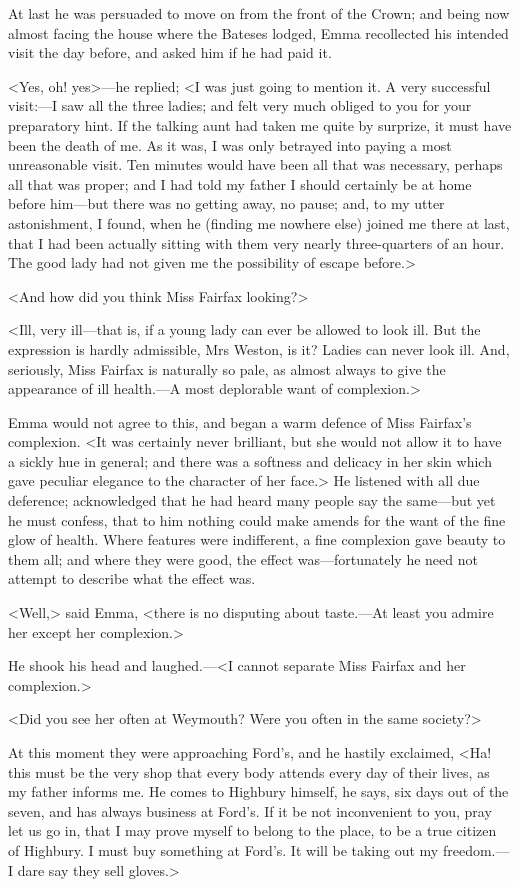 At last he was persuaded to move on from the front of the Crown; and being now almost facing the house where the Bateses lodged, Emma recollected his intended visit the day before, and asked him if he had paid it.

<Yes, oh! yes>—he replied; <I was just going to mention it. A very successful visit:—I saw all the three ladies; and felt very much obliged to you for your preparatory hint. If the talking aunt had taken me quite by surprize, it must have been the death of me. As it was, I was only betrayed into paying a most unreasonable visit. Ten minutes would have been all that was necessary, perhaps all that was proper; and I had told my father I should certainly be at home before him—but there was no getting away, no pause; and, to my utter astonishment, I found, when he (finding me nowhere else) joined me there at last, that I had been actually sitting with them very nearly three-quarters of an hour. The good lady had not given me the possibility of escape before.>

<And how did you think Miss Fairfax looking?>

<Ill, very ill—that is, if a young lady can ever be allowed to look ill. But the expression is hardly admissible, Mrs Weston, is it? Ladies can never look ill. And, seriously, Miss Fairfax is naturally so pale, as almost always to give the appearance of ill health.—A most deplorable want of complexion.>

Emma would not agree to this, and began a warm defence of Miss Fairfax's complexion. <It was certainly never brilliant, but she would not allow it to have a sickly hue in general; and there was a softness and delicacy in her skin which gave peculiar elegance to the character of her face.> He listened with all due deference; acknowledged that he had heard many people say the same—but yet he must confess, that to him nothing could make amends for the want of the fine glow of health. Where features were indifferent, a fine complexion gave beauty to them all; and where they were good, the effect was—fortunately he need not attempt to describe what the effect was.

<Well,> said Emma, <there is no disputing about taste.—At least you admire her except her complexion.>

He shook his head and laughed.—<I cannot separate Miss Fairfax and her complexion.>

<Did you see her often at Weymouth? Were you often in the same society?>

At this moment they were approaching Ford's, and he hastily exclaimed, <Ha! this must be the very shop that every body attends every day of their lives, as my father informs me. He comes to Highbury himself, he says, six days out of the seven, and has always business at Ford's. If it be not inconvenient to you, pray let us go in, that I may prove myself to belong to the place, to be a true citizen of Highbury. I must buy something at Ford's. It will be taking out my freedom.—I dare say they sell gloves.>

